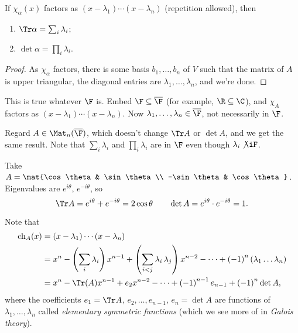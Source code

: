 \begin{proposition}
	If $\chi_\alpha(x)$ factors as $\left( x-\lambda_1 \right) \cdots \left( x-\lambda_n \right)$ (repetition allowed), then
	\begin{enumerate}
		\shortskip
		\item $\Tr \alpha = \sum_i \lambda_i$;
		\item $\det\alpha = \prod_i \lambda_i$.
	\end{enumerate}
\end{proposition}

\begin{proof}
	As $\chi_\alpha$ factors, there is some basis $b_1,\ldots,b_n$ of $V$ such that the matrix of $A$ is upper triangular, the diagonal entries are $\lambda_1,\ldots,\lambda_n$, and we're done.
\end{proof}

\begin{remark}
	This is true whatever $\F$ is. Embed $\F\subseteq\overline{\F}$ (for example, $\R\subseteq\C$), and $\chi_A$ factors as $\left( x-\lambda_1 \right) \cdots \left( x-\lambda_n \right)$. Now $\lambda_1,\ldots,\lambda_n \in \overline{\F}$, not necessarily in $\F$.
	
	Regard $A\in\Mat_n(\overline{\F})$, which doesn't change $\Tr A$ or $\det A$, and we get the same result. Note that $\sum_i \lambda_i$ and $\prod_i \lambda_i$ are in $\F$ even though $\lambda_i\not\iF$.
\end{remark}

\begin{example}
	Take $A=\mat{\cos\theta & \sin\theta \\ -\sin\theta & \cos\theta}$. Eigenvalues are $e^{i\theta}$, $e^{-i\theta}$, so
	\begin{equation*}
		\Tr A = e^{i\theta}+e^{-i\theta} = 2\cos\theta
		\qquad
		\det A = e^{i\theta} \cdot e^{-i\theta} = 1.
	\end{equation*}
\end{example}

	Note that
	\begin{align*}
		   \chi_A(x)
		&= \left( x-\lambda_1 \right) \cdots \left( x-\lambda_n \right) \\
		&= x^n - \left( \sum_i \lambda_i \right) x^{n-1} + \left( \sum_{i<j} \lambda_i\,\lambda_j \right) x^{n-2} - \cdots + \left( -1 \right)^n \left( \lambda_1\ldots\lambda_n \right) \\
		&= x^n - \Tr(A) x^{n-1} + e_2 x^{n-2} - \cdots  + \left( -1 \right)^{n-1} e_{n-1} + \left( -1 \right)^n \det A,
	\end{align*}
	where the coefficients $e_1=\Tr A$, $e_2,\ldots,e_{n-1}$, $e_n=\det A$ are functions of $\lambda_1,\ldots,\lambda_n$ called \emph{elementary symmetric functions} (which we see more of in \emph{Galois theory}).
	
